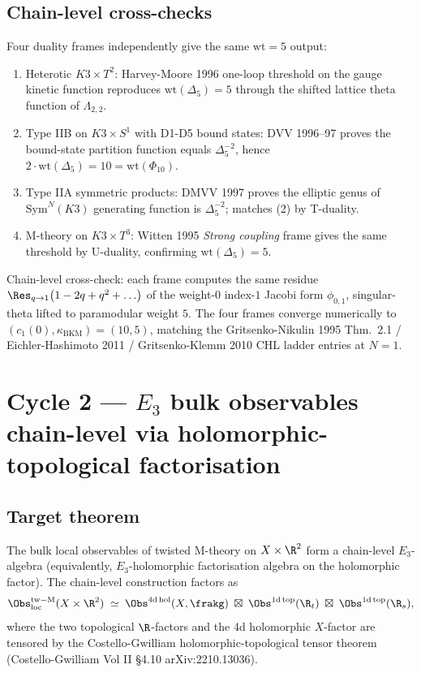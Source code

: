 \subsection*{Chain-level cross-checks}

Four duality frames independently give the same $\mathrm{wt}=5$ output:

\begin{enumerate}
\item Heterotic $K3 \times T^2$: Harvey-Moore 1996 one-loop threshold
on the gauge kinetic function reproduces $\mathrm{wt}(\Delta_5) = 5$
through the shifted lattice theta function of $\Lambda_{2,2}$.
\item Type IIB on $K3 \times S^1$ with D1-D5 bound states:
DVV 1996--97 proves the bound-state partition function equals
$\Delta_5^{-2}$, hence $2\cdot\mathrm{wt}(\Delta_5) = 10 =
\mathrm{wt}(\Phi_{10})$.
\item Type IIA symmetric products: DMVV 1997 proves the elliptic
genus of $\mathrm{Sym}^N(K3)$ generating function is
$\Delta_5^{-2}$; matches (2) by T-duality.
\item M-theory on $K3 \times T^3$: Witten 1995 \emph{Strong coupling}
frame gives the same threshold by U-duality, confirming
$\mathrm{wt}(\Delta_5) = 5$.
\end{enumerate}

Chain-level cross-check: each frame computes the same residue
$\Res_{q\to 1}\bigl(1 - 2q + q^2 + \ldots\bigr)$ of the
weight-$0$ index-$1$ Jacobi form $\phi_{0,1}$, singular-theta
lifted to paramodular weight $5$. The four frames converge
numerically to $(c_1(0), \kappa_{\mathrm{BKM}}) = (10, 5)$,
matching the Gritsenko-Nikulin 1995 Thm.~2.1 /
Eichler-Hashimoto 2011 / Gritsenko-Klemm 2010 CHL ladder
entries at $N = 1$.

\section{Cycle 2 --- $E_3$ bulk observables chain-level via
holomorphic-topological factorisation}
\label{sec:agent12-E3-chain-level}

\subsection*{Target theorem}

The bulk local observables of twisted M-theory on $X \times \R^2$
form a chain-level $E_3$-algebra (equivalently, $E_3$-holomorphic
factorisation algebra on the holomorphic factor). The chain-level
construction factors as
\[
 \Obs^{\mathrm{tw-M}}_{\mathrm{loc}}(X \times \R^2)
 \;\simeq\;
 \Obs^{4\mathrm{d\,hol}}(X, \frakg)
 \;\boxtimes\;
 \Obs^{1\mathrm{d\,top}}(\R_t)
 \;\boxtimes\;
 \Obs^{1\mathrm{d\,top}}(\R_s),
\]
where the two topological $\R$-factors and the 4d holomorphic $X$-factor
are tensored by the Costello-Gwilliam holomorphic-topological tensor
theorem (Costello-Gwilliam Vol II \S4.10 arXiv:2210.13036).

